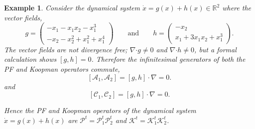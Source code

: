 \documentclass[pdflatex,sn-mathphys]{sn-jnl}%
\renewcommand{\P}{\mathcal{P}}
\newcommand{\C}{\mathcal{C}}
\newcommand{\K}{\mathcal{K}}
\theoremstyle{thmstyleone}%
\theoremstyle{thmstyletwo}%
\newtheorem{example}{Example}%
\theoremstyle{thmstylethree}%
\begin{document}
\begin{example}
    Consider the dynamical system $\dot{x} = g(x)+h(x) \in \mathbb{R}^2$ where the vector fields,
    \[
    g = \begin{pmatrix}
    -x_1-x_1x_2-x_1^3\\
    -x_2-x_2^2+x_1^2+x_1^4
    \end{pmatrix} \quad \quad \text{and} \quad \quad 
    h= \begin{pmatrix}
    -x_2\\
    x_1+3x_1x_2+x_1^3
    \end{pmatrix}.
    \]
   The vector fields are not divergence free; $\nabla \boldsymbol{\cdot} g \neq 0$ and $\nabla \boldsymbol{\cdot} h \neq 0$, but  a formal calculation shows $[g,h]=0$. Therefore the infinitesimal generators of both the PF and Koopman operators commute,
    \[ [\mathcal{A}_1, \mathcal{A}_2] = [g,h] \cdot \nabla = 0.
    \]
    and
    \[ [\C_1, \C_2] = [g,h] \cdot \nabla = 0.
    \]
    
    Hence the PF and Koopman operators of the dynamical system $\dot{x} = g(x) + h(x)$ are $\mathcal{P}^t = \P_1^t\P_2^t$ and $\K^t= \K_1^t\K_2^t$.
\end{example}
\end{document}
